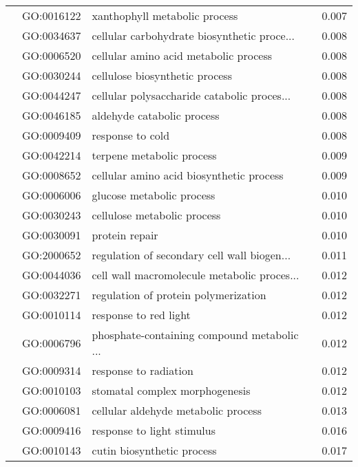 \begin{longtable}{lllr}
   & GO:0016122 &                xanthophyll metabolic process &         0.007 \\
   & GO:0034637 &  cellular carbohydrate biosynthetic proce... &         0.008 \\
   & GO:0006520 &        cellular amino acid metabolic process &         0.008 \\
   & GO:0030244 &               cellulose biosynthetic process &         0.008 \\
   & GO:0044247 &  cellular polysaccharide catabolic proces... &         0.008 \\
   & GO:0046185 &                   aldehyde catabolic process &         0.008 \\
   & GO:0009409 &                             response to cold &         0.008 \\
   & GO:0042214 &                    terpene metabolic process &         0.009 \\
   & GO:0008652 &     cellular amino acid biosynthetic process &         0.009 \\
   & GO:0006006 &                    glucose metabolic process &         0.010 \\
   & GO:0030243 &                  cellulose metabolic process &         0.010 \\
   & GO:0030091 &                               protein repair &         0.010 \\
   & GO:2000652 &  regulation of secondary cell wall biogen... &         0.011 \\
   & GO:0044036 &  cell wall macromolecule metabolic proces... &         0.012 \\
   & GO:0032271 &         regulation of protein polymerization &         0.012 \\
   & GO:0010114 &                        response to red light &         0.012 \\
   & GO:0006796 &  phosphate-containing compound metabolic ... &         0.012 \\
   & GO:0009314 &                        response to radiation &         0.012 \\
   & GO:0010103 &               stomatal complex morphogenesis &         0.012 \\
   & GO:0006081 &          cellular aldehyde metabolic process &         0.013 \\
   & GO:0009416 &                   response to light stimulus &         0.016 \\
   & GO:0010143 &                   cutin biosynthetic process &         0.017 \\

\end{longtable}
